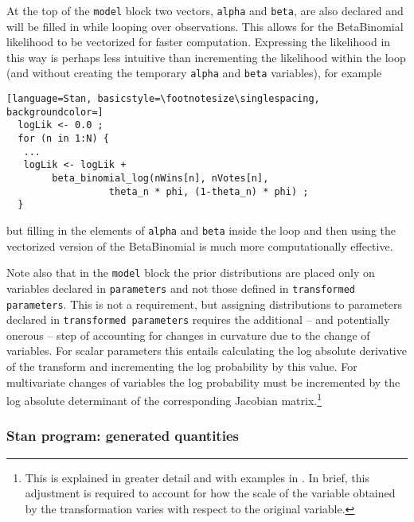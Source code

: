 At the top of the {\tt model} block two vectors, {\tt alpha} and {\tt beta}, are also declared and will be filled in while looping over observations. This allows for the BetaBinomial likelihood to be vectorized for faster computation. Expressing the likelihood in this way is perhaps less intuitive than incrementing the likelihood within the loop (and without creating the temporary {\tt alpha} and {\tt beta} variables), for example

\begin{lstlisting}[language=Stan, basicstyle=\footnotesize\singlespacing, backgroundcolor=]
  logLik <- 0.0 ;
  for (n in 1:N) {
   ...
   logLik <- logLik +
   		beta_binomial_log(nWins[n], nVotes[n], 
   				  theta_n * phi, (1-theta_n) * phi) ;
  }
\end{lstlisting}
%
\noindent but filling in the elements of {\tt alpha} and {\tt beta} inside the loop and then using the vectorized version of the BetaBinomial is much more computationally effective. 

Note also that in the {\tt model} block the prior distributions are placed only on variables declared in {\tt parameters}  and not those defined in {\tt transformed parameters}. This is not a requirement, but assigning distributions to parameters declared in {\tt transformed parameters} requires the additional -- and potentially onerous -- step of accounting for changes in curvature due to the change of variables. For scalar parameters this entails calculating the log absolute derivative of the transform and incrementing the log probability by this value. For multivariate changes of variables the log probability must be incremented by the log absolute determinant of the corresponding Jacobian matrix.\footnote{This is explained in greater detail and with examples in . In brief, this adjustment is required to account for how the scale of the variable obtained by the transformation varies with respect to the original variable.}






\subsubsection{Stan program: generated quantities}

